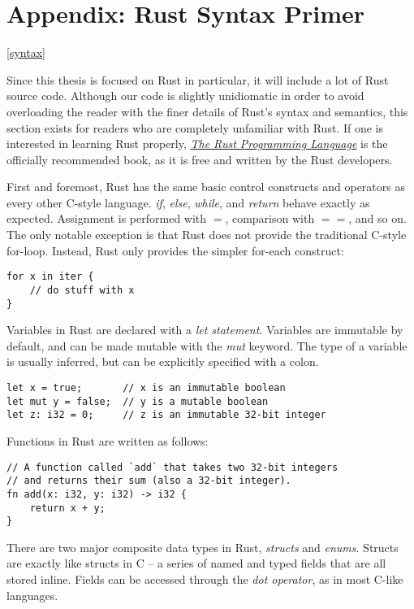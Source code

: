 \section{Appendix: Rust Syntax Primer}
\ref{syntax}

Since this thesis is focused on Rust in particular, it will include a lot of
Rust source code. Although our code is slightly unidiomatic
in order to avoid overloading the reader with the finer details of Rust's syntax
and semantics, this section exists for readers who are completely unfamiliar
with Rust. If one is interested in learning Rust properly,
\href{https://doc.rust-lang.org/book/}{\emph{The Rust Programming Language}}
is the officially recommended book, as it is free and written by the Rust developers.

First and foremost, Rust has the same basic control constructs and operators
as every other C-style language. \emph{if}, \emph{else}, \emph{while}, and
\emph{return} behave exactly as expected. Assignment is performed with $=$,
comparison with $==$, and so on. The only notable exception is that Rust does
not provide the traditional C-style for-loop. Instead, Rust only provides the
simpler for-each construct:

\begin{verbatim}
for x in iter {
    // do stuff with x
}
\end{verbatim}

Variables in Rust are declared with a \emph{let statement}. Variables are
immutable by default, and can be made mutable with the \emph{mut}
keyword. The type of a variable is usually inferred, but can be explicitly
specified with a colon.

\begin{verbatim}
let x = true;       // x is an immutable boolean
let mut y = false;  // y is a mutable boolean
let z: i32 = 0;     // z is an immutable 32-bit integer
\end{verbatim}

Functions in Rust are written as follows:

\begin{verbatim}
// A function called `add` that takes two 32-bit integers
// and returns their sum (also a 32-bit integer).
fn add(x: i32, y: i32) -> i32 {
    return x + y;
}
\end{verbatim}

There are two major composite data types in Rust, \emph{structs} and \emph{enums}.
Structs are exactly like structs in C -- a series of named and typed fields that
are all stored inline. Fields can be accessed through the \emph{dot operator},
as in most C-like languages.

